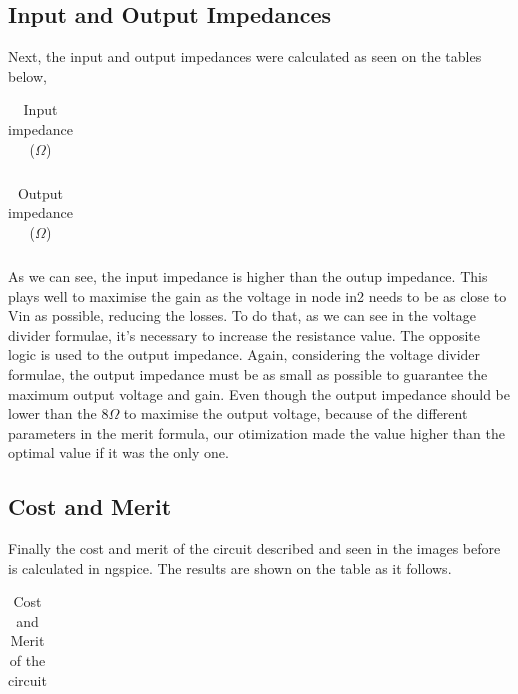 \subsection{Input and Output Impedances}
\par Next, the input and output impedances were calculated as seen on the tables below,

\begin{table}[H]
  \centering
  \begin{tabular}{|l|r|}
    \hline    
   
   \end{tabular}
  \caption{Input impedance ($\Omega$)}
    \label{tab:ZI}
\end{table}

\begin{table}[H]
  \centering
  \begin{tabular}{|l|r|}
    \hline    
   
   \end{tabular}
  \caption{Output impedance ($\Omega$)}
  
  \label{tab:ZO}
\end{table}

\par As we can see, the input impedance is higher than the outup impedance. This plays well to maximise the gain as the voltage in node in2 needs to be as close to Vin as possible, reducing the losses. To do that, as we can see in the voltage divider formulae, it's necessary to increase the resistance value. The opposite logic is used to the output impedance. Again, considering the voltage divider formulae, the output impedance must be as small as possible to guarantee the maximum output voltage and gain. Even though the output impedance should be lower than the $8\Omega$ to maximise the output voltage, because of the different parameters in the merit formula, our otimization made the value higher than the optimal value if it was the only one. 

\subsection {Cost and Merit}
\par Finally the cost and merit of the circuit described and seen in the images before  is calculated in ngspice. The results are shown on the table as it follows.

\begin{table}[H]
  \centering
  \begin{tabular}{|l|r|}
    \hline    
   
   \end{tabular}
  \caption{Cost and Merit of the circuit}
  \label{tab:cost}
\end{table}
\newpage
